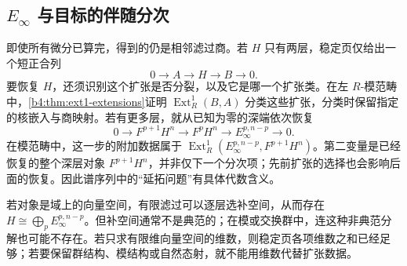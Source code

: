 \subsection{\texorpdfstring{\(E_\infty\) 与目标的伴随分次}{E∞ 与目标的伴随分次}}
\label{b4:subsec:1403:03}

即使所有微分已算完，得到的仍是相邻滤过商。若 \(H\) 只有两层，稳定页仅给出一个短正合列
\[
	0\longrightarrow A\longrightarrow H\longrightarrow B\longrightarrow0.
\]
要恢复 \(H\)，还须识别这个扩张是否分裂，以及它是哪一个扩张类。在左 \(R\)-模范畴中，\cref{b4:thm:ext1-extensions}证明 \(\operatorname{Ext}_R^1(B,A)\) 分类这些扩张，分类时保留指定的核嵌入与商映射。若有更多层，就从已知为零的深端依次恢复
\[
	0\longrightarrow F^{p+1}H^n\longrightarrow F^pH^n \longrightarrow E_\infty^{p,n-p}\longrightarrow0.
\]
在模范畴中，这一步的附加数据属于 \(\operatorname{Ext}_R^1(E_\infty^{p,n-p},F^{p+1}H^n)\)。第二变量是已经恢复的整个深层对象 \(F^{p+1}H^n\)，并非仅下一个分次项；先前扩张的选择也会影响后面的恢复。因此谱序列中的“延拓问题”有具体代数含义。

\ProseParagraphBreak
若对象是域上的向量空间，有限滤过可以逐层选补空间，从而存在 \(H\cong\bigoplus_pE_\infty^{p,n-p}\)。但补空间通常不是典范的；在模或交换群中，连这种非典范分解也可能不存在。若只求有限维向量空间的维数，则稳定页各项维数之和已经足够；若要保留群结构、模结构或自然态射，就不能用维数代替扩张数据。
